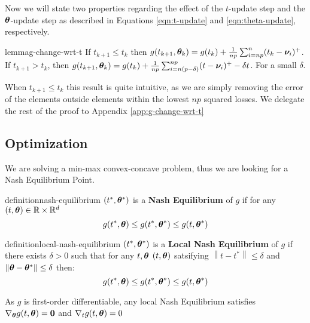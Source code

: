 \documentclass{article} %
\newenvironment{proofsketch}{%
	\renewcommand{\proofname}{Proof Sketch}\proof}{\endproof}
\newcommand{\norm}[1]{\left\lVert#1\right\rVert}
\begin{document}
	Now we will state two properties regarding the effect of the $t$-update step and the ${\bm{\theta}}$-update step as described in Equations \ref{eqn:t-update} and \ref{eqn:theta-update}, respectively. 
	\begin{restatable}{lemma}{g-change-wrt-t}
		\label{lem:g-change-wrt-t}
		If $t_{k+1} \leq t_k$ then $ g(t_{k+1},{\bm{\theta}}_k) = g(t_{k}) + \frac{1}{np}\sum_{i=np}^n(t_k - {\bm{\nu}}_i)^+$. If $t_{k+1} > t_k$, then $ g(t_{k+1},{\bm{\theta}}_k) = g(t_k) + \frac{1}{np}\sum_{i=n(p-\delta)}^{np}(t-{\bm{\nu}}_i)^+  - \delta t$. For a small $\delta$. 
	\end{restatable}
	\begin{proofsketch}
		When $t_{k+1} \leq t_k$ this result is quite intuitive, as we are simply removing the error of the elements outside elements within the lowest $np$ squared losses. We delegate the rest of the proof to Appendix \ref{app:g-change-wrt-t}
	\end{proofsketch}

	\subsection{Optimization}

	We are solving a min-max convex-concave problem, thus we are looking for a Nash Equilibrium Point. 
	
	\begin{restatable}{definition}{nash-equilibrium}
		\label{def:nash-equilibrium}
		$(t^*,{\bm{\theta}}^*)$ is a \textbf{Nash Equilibrium} of $g$ if for any $(t,{\bm{\theta}}) \in \mathbb{R}\times\mathbb{R}^d$\vspace{1em}
		\begin{equation}
			g(t^*,{\bm{\theta}}) \leq g(t^*,{\bm{\theta}}^*) \leq g(t,{\bm{\theta}}^*)
		\end{equation}
	\end{restatable}	
	\begin{restatable}{definition}{local-nash-equilibrium}
		\label{def:local-nash-equilibrium}
		$(t^*,{\bm{\theta}}^*)$ is a \textbf{Local Nash Equilibrium} of $g$ if there exists $\delta > 0$ such that for any $t,{\bm{\theta}}$ $(t,{\bm{\theta}})$ satsifying $\norm{t - t^*} \leq \delta$ and $\norm{\vtheta -\vtheta^*} \leq \delta$ then: 
		\vspace{1em}
		\begin{equation}
			g(t^*,{\bm{\theta}}) \leq g(t^*,{\bm{\theta}}^*) \leq g(t,{\bm{\theta}}^*)
		\end{equation}
	\end{restatable}
	\begin{proposition}\label{prop:first-order-nash}
		As $g$ is first-order differentiable,  any local Nash Equilibrium satisfies $\nabla_{\bm{\theta}} g(t,{\bm{\theta}}) = \mathbf{0}$ and $\nabla_t g(t,{\bm{\theta}}) = 0$
	\end{proposition}
	
\end{document}
